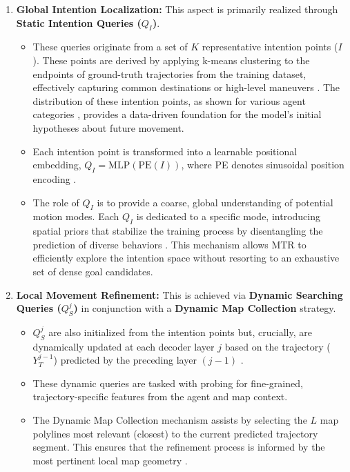 \begin{enumerate}
    \item \textbf{Global Intention Localization:} This aspect is primarily realized through \textbf{Static Intention Queries ($Q_I$)}.
    \begin{itemize}
        \item These queries originate from a set of $K$ representative intention points ($I$). These points are derived by applying k-means clustering to the endpoints of ground-truth trajectories from the training dataset, effectively capturing common destinations or high-level maneuvers \cite{Shi2022MTR, Shi2022MTR_A}. The distribution of these intention points, as shown for various agent categories \cite{Shi2022MTR}, provides a data-driven foundation for the model's initial hypotheses about future movement.
        \item Each intention point is transformed into a learnable positional embedding, $Q_I = \text{MLP}(\text{PE}(I))$, where PE denotes sinusoidal position encoding \cite{Shi2022MTR, Shi2022MTR_A}.
        \item The role of $Q_I$ is to provide a coarse, global understanding of potential motion modes. Each $Q_I$ is dedicated to a specific mode, introducing spatial priors that stabilize the training process by disentangling the prediction of diverse behaviors \cite{Shi2022MTR, Shi2022MTR_A}. This mechanism allows MTR to efficiently explore the intention space without resorting to an exhaustive set of dense goal candidates.
    \end{itemize}
    \item \textbf{Local Movement Refinement:} This is achieved via \textbf{Dynamic Searching Queries ($Q_S^j$)} in conjunction with a \textbf{Dynamic Map Collection} strategy.
    \begin{itemize}
        \item $Q_S^j$ are also initialized from the intention points but, crucially, are dynamically updated at each decoder layer $j$ based on the trajectory ($Y_T^{j-1}$) predicted by the preceding layer $(j-1)$ \cite{Shi2022MTR}.
        \item These dynamic queries are tasked with probing for fine-grained, trajectory-specific features from the agent and map context.
        \item The Dynamic Map Collection mechanism assists by selecting the $L$ map polylines most relevant (closest) to the current predicted trajectory segment. This ensures that the refinement process is informed by the most pertinent local map geometry \cite{Shi2022MTR, Shi2022MTR_A}.

\end{itemize}
\end{enumerate}
